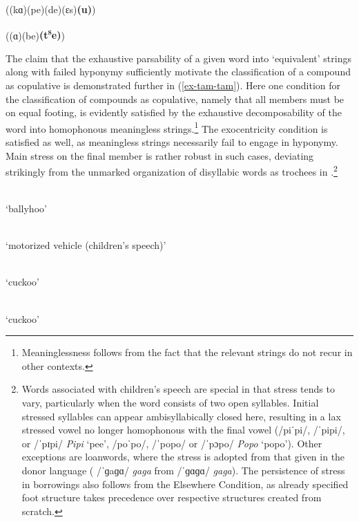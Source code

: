 \documentclass[output=paper
 ,nobabel
 ,draftmode
 ,colorlinks, citecolor=brown
]{langscibook}
\begin{document}
\ex ((kɑ)(pe)(de)(ɛs)\textbf{(u)})  		

\ex\label{ex-abc-head}
((ɑ)(be)\textbf{(t\textsuperscript{s}e)})  

\zl

\largerpage
\noindent
The claim that the exhaustive parsability of a given word into `equivalent' strings along with
failed hyponymy sufficiently motivate the classification of a compound as copulative is demonstrated
further in (\ref{ex-tam-tam}). Here one condition for the classification of compounds as copulative,
namely that all members must be on equal footing, is evidently satisfied by the exhaustive
decomposability of the word into homophonous meaningless strings.\footnote{Meaninglessness follows
  from the fact that the relevant strings do not recur in other contexts.} The exocentricity
condition is satisfied as well, as meaningless strings necessarily fail to engage in hyponymy. Main
stress on the final member is rather robust in such cases, deviating strikingly from the unmarked
organization of disyllabic words as trochees in .\footnote{\label{fn-words-associated}Words
  associated with children's speech are special in that stress tends to vary, particularly when the
  word consists of two open syllables. Initial stressed syllables can appear ambisyllabically closed
  here, resulting in a lax stressed vowel no longer homophonous with the final vowel (\eg /piˈpi/,
  /ˈpipi/, or /ˈpɪpi/ \emph{Pipi} `pee', /poˈpo/, /ˈpopo/ or /ˈpɔpo/ \emph{Popo} `popo'). Other
  exceptions are loanwords, where the stress is adopted from that given in the donor language (\eg
  /ˈɡaɡɑ/ \emph{gaga} from  /ˈɡɑɡɑ/ \emph{gaga}). The persistence of stress in borrowings
  also follows from the Elsewhere Condition, as already specified foot structure takes precedence
  over respective structures created from scratch.}  

\eal\label{ex-tam-tam}

\ex {}\\
    `ballyhoo'

\ex {}\\
    `motorized vehicle (children's speech)'

\ex {}\\
    `cuckoo'

\ex {}\\
    `cuckoo'
\end{document}
